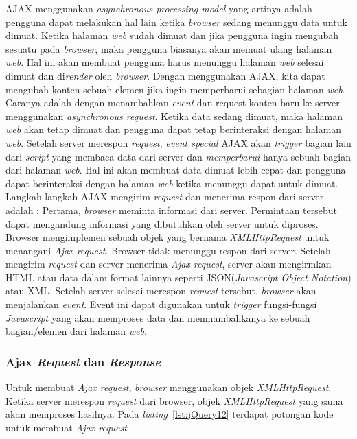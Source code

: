 AJAX menggunakan \textit{asynchronous processing model} yang artinya adalah pengguna dapat melakukan hal lain ketika \textit{browser} sedang menunggu data untuk dimuat. Ketika halaman \textit{web} sudah dimuat dan jika pengguna ingin mengubah sesuatu pada \textit{browser}, maka pengguna biasanya akan memuat ulang halaman \textit{web}. Hal ini akan membuat pengguna harus menunggu halaman \textit{web} selesai dimuat dan di\textit{render} oleh \textit{browser}. Dengan menggunakan AJAX, kita dapat mengubah konten sebuah elemen jika ingin memperbarui sebagian halaman \textit{web}. Caranya adalah dengan menambahkan \textit{event} dan request konten baru ke server menggunakan \textit{asynchronous request}. Ketika data sedang dimuat, maka halaman \textit{web} akan tetap dimuat dan pengguna dapat tetap berinteraksi dengan halaman \textit{web}. Setelah server merespon \textit{request}, \textit{event special} AJAX akan \textit{trigger} bagian lain dari \textit{script} yang membaca data dari server dan \textit{memperbarui} hanya sebuah bagian dari halaman \textit{web}. Hal ini akan membuat data dimuat lebih cepat dan pengguna dapat berinteraksi dengan halaman \textit{web} ketika menunggu dapat untuk dimuat.\\

Langkah-langkah AJAX mengirim \textit{request} dan menerima respon dari server adalah : Pertama, \textit{browser} meminta informasi dari server. Permintaan tersebut dapat mengandung informasi yang dibutuhkan oleh server untuk diproses. Browser mengimplemen sebuah objek yang bernama \textit{XMLHttpRequest} untuk menangani \textit{Ajax request}. Browser tidak menunggu respon dari server. Setelah mengirim \textit{request} dan server menerima \textit{Ajax request}, server akan mengirmkan HTML atau data dalam format lainnya seperti JSON(\textit{Javascript Object Notation}) atau XML. Setelah server selesai merespon \textit{request} tersebut, \textit{browser} akan menjalankan \textit{event}. Event ini dapat digunakan untuk \textit{trigger} fungsi-fungsi \textit{Javascript} yang akan memproses data dan memnambahkanya ke sebuah bagian/elemen dari halaman \textit{web}.

\subsubsection{Ajax \textit{Request} dan \textit{Response}}
Untuk membuat \textit{Ajax request}, \textit{browser} menggunakan objek \textit{XMLHttpRequest}. Ketika server merespon \textit{request} dari browser, objek \textit{XMLHttpRequest} yang sama akan memproses hasilnya. Pada \textit{listing}~\ref{lst:jQuery12} terdapat potongan kode untuk membuat \textit{Ajax request}. 

